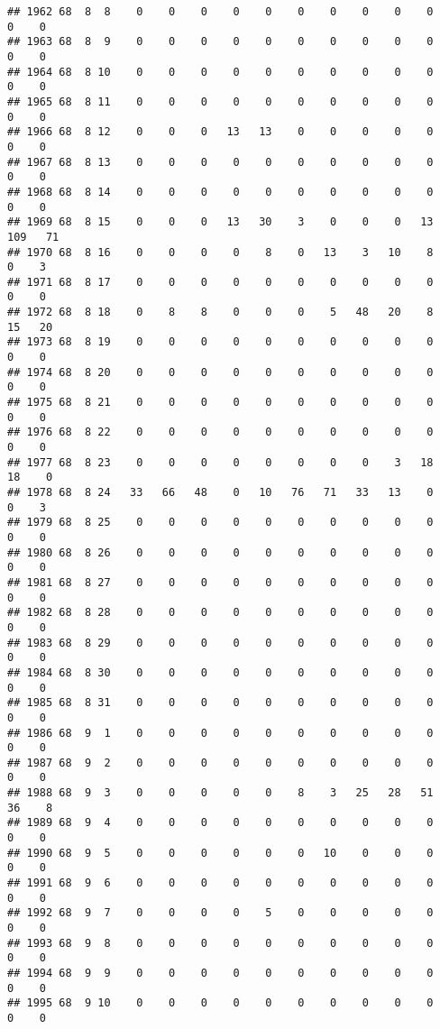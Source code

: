 \documentclass[]{article}
\begin{document}
\begin{verbatim}
## 1962 68  8  8    0    0    0    0    0    0    0    0    0    0    0    0
## 1963 68  8  9    0    0    0    0    0    0    0    0    0    0    0    0
## 1964 68  8 10    0    0    0    0    0    0    0    0    0    0    0    0
## 1965 68  8 11    0    0    0    0    0    0    0    0    0    0    0    0
## 1966 68  8 12    0    0    0   13   13    0    0    0    0    0    0    0
## 1967 68  8 13    0    0    0    0    0    0    0    0    0    0    0    0
## 1968 68  8 14    0    0    0    0    0    0    0    0    0    0    0    0
## 1969 68  8 15    0    0    0   13   30    3    0    0    0   13  109   71
## 1970 68  8 16    0    0    0    0    8    0   13    3   10    8    0    3
## 1971 68  8 17    0    0    0    0    0    0    0    0    0    0    0    0
## 1972 68  8 18    0    8    8    0    0    0    5   48   20    8   15   20
## 1973 68  8 19    0    0    0    0    0    0    0    0    0    0    0    0
## 1974 68  8 20    0    0    0    0    0    0    0    0    0    0    0    0
## 1975 68  8 21    0    0    0    0    0    0    0    0    0    0    0    0
## 1976 68  8 22    0    0    0    0    0    0    0    0    0    0    0    0
## 1977 68  8 23    0    0    0    0    0    0    0    0    3   18   18    0
## 1978 68  8 24   33   66   48    0   10   76   71   33   13    0    0    3
## 1979 68  8 25    0    0    0    0    0    0    0    0    0    0    0    0
## 1980 68  8 26    0    0    0    0    0    0    0    0    0    0    0    0
## 1981 68  8 27    0    0    0    0    0    0    0    0    0    0    0    0
## 1982 68  8 28    0    0    0    0    0    0    0    0    0    0    0    0
## 1983 68  8 29    0    0    0    0    0    0    0    0    0    0    0    0
## 1984 68  8 30    0    0    0    0    0    0    0    0    0    0    0    0
## 1985 68  8 31    0    0    0    0    0    0    0    0    0    0    0    0
## 1986 68  9  1    0    0    0    0    0    0    0    0    0    0    0    0
## 1987 68  9  2    0    0    0    0    0    0    0    0    0    0    0    0
## 1988 68  9  3    0    0    0    0    0    8    3   25   28   51   36    8
## 1989 68  9  4    0    0    0    0    0    0    0    0    0    0    0    0
## 1990 68  9  5    0    0    0    0    0    0   10    0    0    0    0    0
## 1991 68  9  6    0    0    0    0    0    0    0    0    0    0    0    0
## 1992 68  9  7    0    0    0    0    5    0    0    0    0    0    0    0
## 1993 68  9  8    0    0    0    0    0    0    0    0    0    0    0    0
## 1994 68  9  9    0    0    0    0    0    0    0    0    0    0    0    0
## 1995 68  9 10    0    0    0    0    0    0    0    0    0    0    0    0

\end{verbatim}
\end{document}
